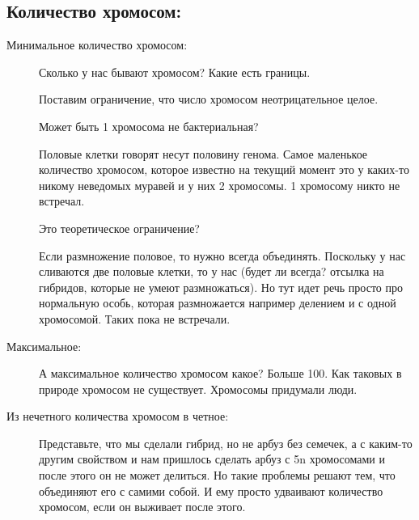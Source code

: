 \subsection{Количество хромосом:}
\begin{description}
\item[Минимальное количество хромосом:]
Сколько у нас бывают хромосом? Какие есть границы.

Поставим ограничение, что число хромосом неотрицательное целое.

Может быть 1 хромосома не бактериальная?

Половые клетки говорят несут половину генома. Самое маленькое количество 
хромосом, которое известно на текущий момент 
это у каких-то никому неведомых муравей и у них 2 хромосомы. 1 хромосому
никто не встречал. 

Это теоретическое ограничение? 

Если размножение половое, то нужно всегда объединять. Поскольку у нас 
сливаются две половые клетки, то у нас (будет ли всегда? отсылка на гибридов, которые не умеют 
размножаться). Но тут идет речь просто про нормальную особь, которая размножается например делением 
и с одной хромосомой. Таких пока не встречали. 
\item[Максимальное:]
А максимальное количество хромосом какое? 
Больше 100. Как таковых в природе хромосом не 
существует. Хромосомы придумали люди. 

\item[Из нечетного количества хромосом в четное:]
Представьте, что мы сделали гибрид, но не арбуз
без семечек, а с каким-то другим свойством и нам пришлось сделать
арбуз с 5n хромосомами и после этого он не может делиться. Но такие
проблемы решают тем, что объединяют его с самими собой. И ему просто
удваивают количество хромосом, если он выживает после этого. 
\end{description}

